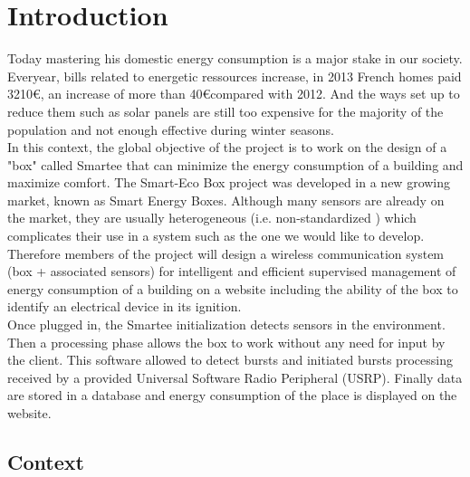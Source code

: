 %
%
\section{Introduction}

Today mastering his domestic energy consumption is a major stake in our society. Everyear, bills related to energetic ressources increase, in 2013 French homes paid 3210\euro, an increase of more than 40\euro compared with 2012. And the ways set up to reduce them such as solar panels are still too expensive for the majority of the population and not enough effective during winter seasons.\\

In this context, the global objective of the project is to work on the design of a "box" called Smartee that can minimize the energy consumption of a building and maximize comfort. The Smart-Eco Box project was developed in a new growing market, known as Smart Energy Boxes. Although many sensors are already on the market, they are usually heterogeneous (i.e. non-standardized ) which complicates their use in a system such as the one we would like to develop. Therefore members of the project will design a wireless communication system (box + associated sensors) for intelligent and efficient supervised management of energy consumption of a building on a website including the ability of the box to identify an electrical device in its ignition.\\

Once plugged in, the Smartee initialization detects sensors in the environment. Then a processing phase allows the box to work without any need for input by the client. This software allowed to detect bursts and initiated bursts processing received by a provided Universal Software Radio Peripheral (USRP). Finally data are stored in a database and energy consumption of the place is displayed on the website. 

\subsection{Context}

